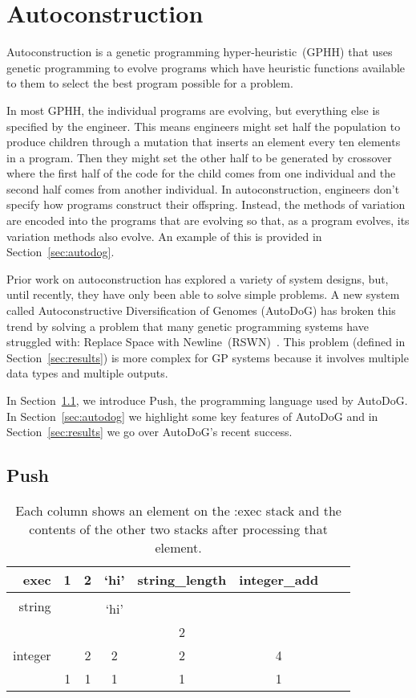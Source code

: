 \documentclass{sig-alternate}
\begin{document}
\section{Autoconstruction}
\label{sec:ac}
Autoconstruction is a genetic programming hyper-heur\-istic~(GPHH) that uses genetic programming to evolve programs which have heuristic functions available to them to select the best program possible for a problem. 

In most GPHH, the individual programs are evolving, but everything else is specified by the engineer. This means engineers might set half the population to produce children through a mutation that inserts an element every ten elements in a program. Then they might set the other half to be generated by crossover where the first half of the code for the child comes from one individual and the second half comes from another individual. In autoconstruction, engineers don't specify how programs construct their offspring. Instead, the methods of variation are encoded into the programs that are evolving so that, as a program evolves, its variation methods also evolve. An example of this is provided in Section~\ref{sec:autodog}.

Prior work on autoconstruction has explored a variety of system designs, but, until recently, they have only been able to solve simple problems. A new system called Autoconstructive Diversification of Genomes (AutoDoG) has broken this trend by solving a problem that many genetic programming systems have struggled with: Replace Space with Newline~(RSWN)~\cite{spector:2016}. This problem (defined in Section~\ref{sec:results}) is more complex for GP systems because it involves multiple data types and multiple outputs.

In Section~\ref{sec:push}, we introduce Push, the programming language used by AutoDoG. In Section~\ref{sec:autodog} we highlight some key features of AutoDoG and in Section~\ref{sec:results} we go over AutoDoG's recent success.

\subsection{Push}
\label{sec:push}

\begin{table}
	\centering
	\begin{tabular}{|r|c|c|c|c|c|c|c|}
		\hline
		exec & 1 & 2 & `hi' & string\_length & integer\_add \\
		\hline
		\hline
		\multirow{2}{*}{string} & & & & & \\
		& & & `hi' &  &  \\
		\hline
		\multirow{3}{*}{integer} & & & & 2 & \\
		& & 2 & 2 & 2 & 4 \\
		& 1 & 1 & 1 & 1 & 1\\
		\hline
	\end{tabular}
	\caption{Each column shows an element on the :exec stack and the contents of the other two stacks after processing that element.}
	\label{tab:push}
\end{table}
\end{document}

